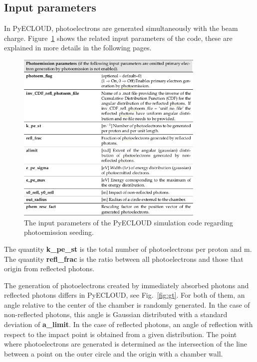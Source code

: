 
\subsection{Input parameters}
\label{sec:input}


In PyECLOUD, photoelectrons are generated simultaneously with the beam charge.
Figure~\ref{fig:input} shows the related input parameters of the code, these are explained in more details in the following pages.

\begin{figure}[tbh]
    \centering
    \includegraphics[width=0.8\textwidth]{../ss/pyecloud_doc.png}
    \caption{The input parameters of the PyECLOUD simulation code regarding photoemission seeding.}
    \label{fig:input}
\end{figure}

The quantity \textbf{k\_pe\_st} is the total number of photoelectrons per proton and m.
\\
The quantity \textbf{refl\_frac} is the ratio between all photoelectrons and those that origin from reflected photons.

The generation of photoelectrons created by immediately absorbed photons and reflected photons differs in PyECLOUD, see Fig.~\ref{fig:gt}.
For both of them, an angle relative to the center of the chamber is randomly generated.
In the case of non-reflected photons, this angle is Gaussian distributed with a standard deviation of \textbf{a\_limit}.
In the case of reflected photons, an angle of reflection with respect to the impact point is obtained from a given distribution.
The point where photoelectrons are generated is determined as the intersection of the line between a point on the outer circle  and the origin with a chamber wall.

